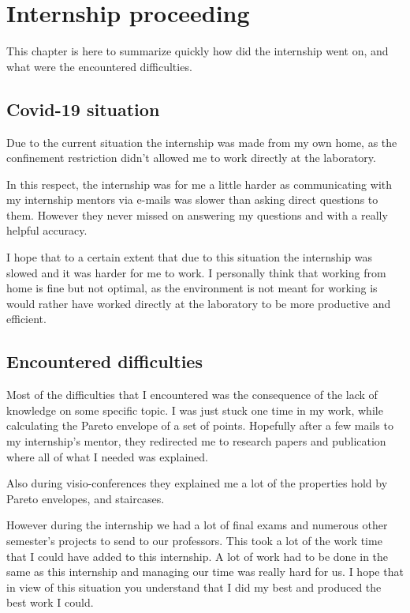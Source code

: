 \chapter{Internship proceeding}
This chapter is here to summarize quickly how did the internship went on, and what were the encountered difficulties.
\section{Covid-19 situation}
Due to the current situation the internship was made from my own home, as the confinement restriction didn't allowed me to work directly at the laboratory.

In this respect, the internship was for me a little harder as communicating with my internship mentors via e-mails was slower than asking direct questions to them. However they never missed on answering my questions and with a really helpful accuracy.

I hope that to a certain extent that due to this situation the internship was slowed and it was harder for me to work. I personally think that working from home is fine but not optimal, as the environment is not meant for working is would rather have worked directly at the laboratory to be more productive and efficient.

\section{Encountered difficulties}
Most of the difficulties that I encountered was the consequence of the lack of knowledge on some specific topic. I was just stuck one time in my work, while calculating the Pareto envelope of a set of points. Hopefully after a few mails to my internship's mentor, they redirected me to research papers and publication where all of what I needed was explained.

Also during visio-conferences they explained me a lot of the properties hold by Pareto envelopes, and staircases.\newline

However during the internship we had a lot of final exams and numerous other semester's projects to send to our professors. This took a lot of the work time that I could have added to this internship. A lot of work had to be done in the same as this internship and managing our time was really hard for us. I hope that in view of this situation you understand that I did my best and produced the best work I could.

